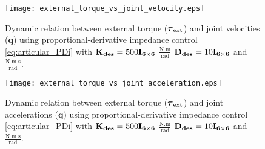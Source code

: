 \begin{figure}
\centering
\texttt{[image: external\_torque\_vs\_joint\_velocity.eps]}
\caption{Dynamic relation between external torque ($\boldsymbol{\tau}_\mathrm{ext}$) and joint velocities ($\mathbf{\dot{q}}$) using proportional-derivative impedance control \eqref{eq:articular_PDi} with $\mathbf{K_{des}}=500\mathbf{I_{6 \times 6}}$ $\mathrm{\frac{N.m}{rad}}$ $\mathbf{D_{des}}=10\mathbf{I_{6 \times 6}}$ and $\mathrm{\frac{N.m.s}{rad}}$.}
\label{fig:act1.1.3_tau_vs_dq}
\end{figure}

\begin{figure}
\centering
\texttt{[image: external\_torque\_vs\_joint\_acceleration.eps]}
\caption{Dynamic relation between external torque ($\boldsymbol{\tau}_\mathrm{ext}$) and joint accelerations ($\mathbf{\ddot{q}}$) using proportional-derivative impedance control \eqref{eq:articular_PDi} with $\mathbf{K_{des}}=500\mathbf{I_{6 \times 6}}$ $\mathrm{\frac{N.m}{rad}}$ $\mathbf{D_{des}}=10\mathbf{I_{6 \times 6}}$ and $\mathrm{\frac{N.m.s}{rad}}$.}
\label{fig:act1.1.3_tau_vs_ddq}
\end{figure}
